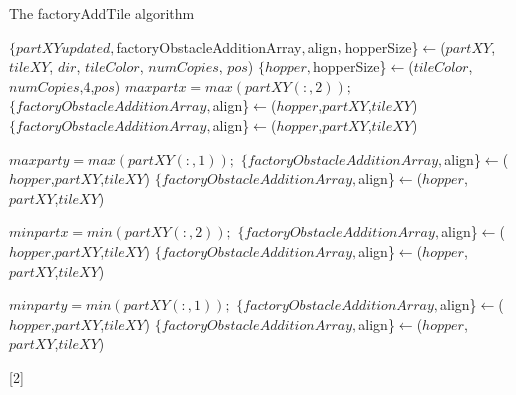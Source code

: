 \begin{algorithm} 
\newcommand\algotext[2]{\end{algorithmic}#2\begin{algorithmic}[2]}
\scriptsize
\caption{The factoryAddTile algorithm}
\begin{algorithmic}[2]
\State$\{partXYupdated, $factoryObstacleAdditionArray$, $align$, \newline$hopperSize\}$\leftarrow${}(\newline$partXY$, $tileXY$, $dir$, $tileColor$, $numCopies$, $pos$)
\State$\{ hopper,$hopperSize\}$\leftarrow${}(\newline$tileColor$,$numCopies$,$4$,$pos$)
$maxpartx=max(partXY(:,2));$
\State$\{factoryObstacleAdditionArray, $align\}$\leftarrow${}(\newline$hopper$,$partXY$,$tileXY$)
\Else
\State$\{factoryObstacleAdditionArray, $align\}$\leftarrow${}(\newline$hopper$,$partXY$,$tileXY$)
\EndIf
\EndIf

$maxparty=max(partXY(:,1));$
\State$\{factoryObstacleAdditionArray, $align\}$\leftarrow${}(\newline$hopper$,$partXY$,$tileXY$)
\Else
\State$\{factoryObstacleAdditionArray, $align\}$\leftarrow${}(\newline$hopper$,$partXY$,$tileXY$)
\EndIf
\EndIf


$minpartx=min(partXY(:,2));$
\State$\{factoryObstacleAdditionArray, $align\}$\leftarrow${}(\newline$hopper$,$partXY$,$tileXY$)
\Else
\State$\{factoryObstacleAdditionArray, $align\}$\leftarrow${}(\newline$hopper$,$partXY$,$tileXY$)
\EndIf
\EndIf


$minparty=min(partXY(:,1));$
\State$\{factoryObstacleAdditionArray, $align\}$\leftarrow${}(\newline$hopper$,$partXY$,$tileXY$)
\Else
\State$\{factoryObstacleAdditionArray, $align\}$\leftarrow${}(\newline$hopper$,$partXY$,$tileXY$)
\EndIf
\EndIf
\end{algorithmic}[2]
\end{algorithm}
 
 
 
 
 
 

